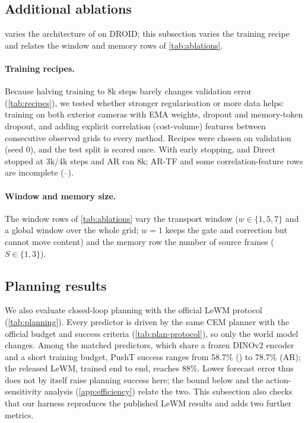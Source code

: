 \FloatBarrier
\subsection{Additional ablations}\label{app:ablations}
 varies the architecture of \ours{} on DROID; this subsection varies the training recipe and relates
the window and memory rows of \cref{tab:ablations}.

\paragraph{Training recipes.} Because halving training to 8k steps barely changes validation error (\cref{tab:recipes}), we
tested whether stronger regularisation or more data helps: training on
both exterior cameras with EMA weights, dropout and memory-token dropout, and adding explicit correlation (cost-volume)
features between consecutive observed grids to every method. Recipes were chosen on validation (seed 0), and the
test split is scored once. With early stopping, \ours{} and Direct stopped at 3k/4k steps and AR ran 8k; AR-TF and some
correlation-feature rows are incomplete (--).
\paragraph{Window and memory size.} The window rows of \cref{tab:ablations} vary the transport window
($w\in\{1,5,7\}$ and a global window over the whole grid; $w{=}1$ keeps the gate and correction but cannot move content)
and the memory row the number of source frames ($S\in\{1,3\}$).

\FloatBarrier
\subsection{Planning results}\label{app:planning-results}

We also evaluate closed-loop planning with the official LeWM protocol (\cref{tab:planning}). Every predictor is driven
by the same CEM planner with the official budget and success criteria (\cref{tab:plan-protocol}), so only the world
model changes. Among the matched predictors, which share a frozen DINOv2 encoder and a short training budget, PushT
success ranges from 58.7\% (\ours{}) to 78.7\% (AR); the released LeWM, trained end to end, reaches 88\%. Lower
forecast error thus does not by itself raise planning success here; the bound below and the action-sensitivity
analysis (\cref{app:efficiency}) relate the two. This subsection also checks that our harness reproduces the published
LeWM results and adds two further metrics.
